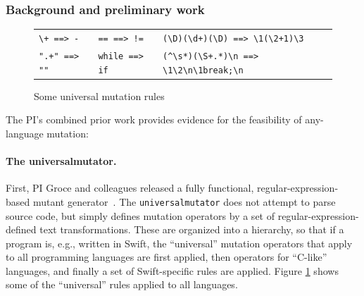 \subsubsection{Background and preliminary work}


\begin{figure}
{\scriptsize
\begin{tabularx}{0.75\textwidth}{XXX}
\verb|\+ ==> -| & \verb|== ==> !=| & \verb|(\D)(\d+)(\D) ==> \1(\2+1)\3|\\
\verb|".+" ==> ""| & \verb|while ==> if| & \verb|(^\s*)(\S+.*)\n ==> \1\2\n\1break;\n|\\
\end{tabularx}
}
\caption{Some universal mutation rules}
\label{fig:rules}
\end{figure}

The PI's combined prior work provides evidence for the
feasibility of any-language mutation:

\paragraph{The universalmutator.} First, PI Groce and colleagues
released a fully functional, regular-expression-based mutant
generator~\cite{regexpMut,universalmutator}.
The {\tt universalmutator}
does not attempt to parse source code, but simply defines mutation
operators by a set of regular-expression-defined text transformations.  These
are organized into a hierarchy, so that if a program is, e.g., written in Swift,
the ``universal'' mutation operators that apply to all programming languages are
first applied, then operators for ``C-like'' languages, and finally a set of
Swift-specific rules are applied.  Figure \ref{fig:rules} shows some of the
``universal'' rules applied to all languages.

